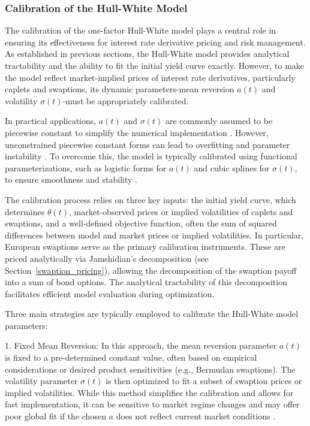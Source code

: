 \subsubsection{Calibration of the Hull-White Model}
The calibration of the one-factor Hull-White model plays a central role in ensuring its effectiveness for interest rate derivative pricing and risk management. As established in previous sections, the Hull-White model provides analytical tractability and the ability to fit the initial yield curve exactly. However, to make the model reflect market-implied prices of interest rate derivatives, particularly caplets and swaptions, its dynamic parameters-mean reversion $a(t)$ and volatility $\sigma(t)$-must be appropriately calibrated.

In practical applications, $a(t)$ and $\sigma(t)$ are commonly assumed to be piecewise constant to simplify the numerical implementation \parencite[p.~7]{gurrieri2009calibration}. However, unconstrained piecewise constant forms can lead to overfitting and parameter instability \parencite[p.~2]{gurrieri2009calibration}. To overcome this, the model is typically calibrated using functional parameterizations, such as logistic forms for $a(t)$ and cubic splines for $\sigma(t)$, to ensure smoothness and stability \parencite[p.~8]{gurrieri2009calibration}.

The calibration process relies on three key inputs: the initial yield curve, which determines $\theta(t)$, market-observed prices or implied volatilities of caplets and swaptions, and a well-defined objective function, often the sum of squared differences between model and market prices or implied volatilities. In particular, European swaptions serve as the primary calibration instruments. These are priced analytically via Jamshidian’s decomposition (see Section~\ref{swaption_pricing}), allowing the decomposition of the swaption payoff into a sum of bond options. The analytical tractability of this decomposition facilitates efficient model evaluation during optimization. 

Three main strategies are typically employed to calibrate the Hull-White model parameters:

1. Fixed Mean Reversion: In this approach, the mean reversion parameter $a(t)$ is fixed to a pre-determined constant value, often based on empirical considerations or desired product sensitivities (e.g., Bermudan swaptions). The volatility parameter $\sigma(t)$ is then optimized to fit a subset of swaption prices or implied volatilities. While this method simplifies the calibration and allows for fast implementation, it can be sensitive to market regime changes and may offer poor global fit if the chosen $a$ does not reflect current market conditions \parencite[p.~13]{gurrieri2009calibration}.

